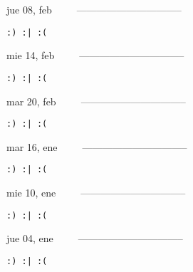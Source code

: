 \documentclass[letterpaper,10pt]{article}
\begin{document}
\begin{multicols}{3}
{jue 08, feb\ \ \ \ \ --------------------------------}
\begin{flushright}\begin{small}\texttt{:) :| :(}\end{small}\end{flushright}
\vfill
{mie 14, feb\ \ \ \ \ --------------------------------}
\begin{flushright}\begin{small}\texttt{:) :| :(}\end{small}\end{flushright}\par
\vfill
{mar 20, feb\ \ \ \ \ --------------------------------}
\begin{flushright}\begin{small}\texttt{:) :| :(}\end{small}\end{flushright}\par
\vfill
\end{multicols}
\vspace{1.05cm}

\begin{multicols}{3}
{mar 16, ene\ \ \ \ \ --------------------------------}
\begin{flushright}\begin{small}\texttt{:) :| :(}\end{small}\end{flushright}
\vfill
{mie 10, ene\ \ \ \ \ --------------------------------}
\begin{flushright}\begin{small}\texttt{:) :| :(}\end{small}\end{flushright}\par
\vfill
{jue 04, ene\ \ \ \ \ --------------------------------}
\begin{flushright}\begin{small}\texttt{:) :| :(}\end{small}\end{flushright}\par
\vfill
\end{multicols}
\vspace{1.05cm}
\end{document}
